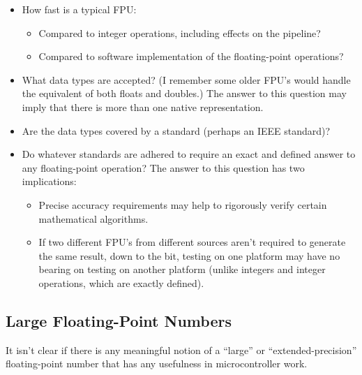 \begin{itemize}
\item How fast is a typical FPU:
      \begin{itemize}
      \item Compared to integer operations, including
            effects on the
            pipeline?
      \item Compared to software implementation of the
            floating-point
            operations?
      \end{itemize}
\item What data types are accepted?  (I remember some older
      FPU's would handle the equivalent of both
      floats and doubles.)  The answer to this question may
      imply that there is more than one native
      representation.
\item Are the data types covered by a standard (perhaps an
      IEEE standard)?
\item Do whatever standards are adhered to require an
      exact and defined answer to any floating-point
      operation?  The answer to this question has two
      implications:
      \begin{itemize}
      \item Precise accuracy requirements may help to
            rigorously verify certain mathematical
            algorithms.
      \item If two different FPU's from different sources
            aren't required to generate the same result,
            down to the bit, testing on one platform may
            have no bearing on testing on another platform
            (unlike integers and integer operations, which
            are exactly defined).
      \end{itemize}
\end{itemize}


\subsection{Large Floating-Point Numbers}
\label{cldd0:srnm0:sfpl0}

It isn't clear if there is any meaningful notion of a 
``large'' or ``extended-precision'' floating-point number 
that has any usefulness in microcontroller work.  

